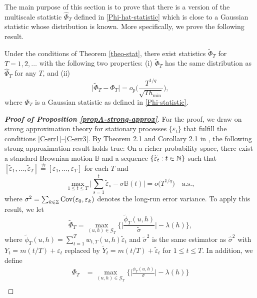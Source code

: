 The main purpose of this section is to prove that there is a version of the multiscale statistic $\widehat{\Phi}_T$ defined in \eqref{Phi-hat-statistic} which is close to a Gaussian statistic whose distribution is known. More specifically, we prove the following result. 
%
%
\begin{propA}\label{propA-strong-approx}
Under the conditions of Theorem \ref{theo-stat}, there exist statistics $\widetilde{\Phi}_T$ for $T = 1,2,\ldots$ with the following two properties: (i) $\widetilde{\Phi}_T$ has the same distribution as $\widehat{\Phi}_T$ for any $T$, and (ii)
\[ \big| \widetilde{\Phi}_T - \Phi_T \big| = o_p \Big( \frac{T^{1/q}}{\sqrt{T h_{\min}}} \Big), \]
where $\Phi_T$ is a Gaussian statistic as defined in \eqref{Phi-statistic}. 
\end{propA}
%
%
\begin{proof}[\textnormal{\textbf{Proof of Proposition \ref{propA-strong-approx}}}] 
For the proof, we draw on strong approximation theory for stationary processes $\{\varepsilon_t\}$ that fulfill the conditions \ref{C-err1}--\ref{C-err3}. By Theorem 2.1 and Corollary 2.1 in \cite{BerkesLiuWu2014}, the following strong approximation result holds true: On a richer probability space, there exist a standard Brownian motion $\mathbb{B}$ and a sequence $\{ \widetilde{\varepsilon}_t: t \in \mathbb{N} \}$ such that $[\widetilde{\varepsilon}_1,\ldots,\widetilde{\varepsilon}_T] \stackrel{\mathcal{D}}{=} [\varepsilon_1,\ldots,\varepsilon_T]$ for each $T$ and 
\begin{equation}\label{eq-strongapprox-dep}
\max_{1 \le t \le T} \Big| \sum\limits_{s=1}^t \widetilde{\varepsilon}_s - \sigma \mathbb{B}(t) \Big| = o\big( T^{1/q} \big) \quad \text{a.s.},  
\end{equation}
where $\sigma^2 = \sum_{k \in \mathbb{Z}} \textnormal{Cov}(\varepsilon_0, \varepsilon_k)$ denotes the long-run error variance. To apply this result, we let 
\[ \widetilde{\Phi}_T = \max_{(u,h) \in \mathcal{G}_T} \Big\{ \Big|\frac{\widetilde{\phi}_T(u,h)}{\widetilde{\sigma}}\Big| - \lambda(h) \Big\}, \]
where $\widetilde{\phi}_T(u,h) = \sum\nolimits_{t=1}^T w_{t,T}(u,h) \widetilde{\varepsilon}_t$ and $\widetilde{\sigma}^2$ is the same estimator as $\widehat{\sigma}^2$ with $Y_t = m(t/T) + \varepsilon_t$ replaced by $\widetilde{Y}_t = m(t/T) + \widetilde{\varepsilon}_t$ for $1 \le t \le T$. In addition, we define
\begin{align*}
\Phi_T & = \max_{(u,h) \in \mathcal{G}_T} \Big\{ \Big|\frac{\phi_T(u,h)}{\sigma}\Big| - \lambda(h) \Big\} \\

\end{align*}
\end{proof}
